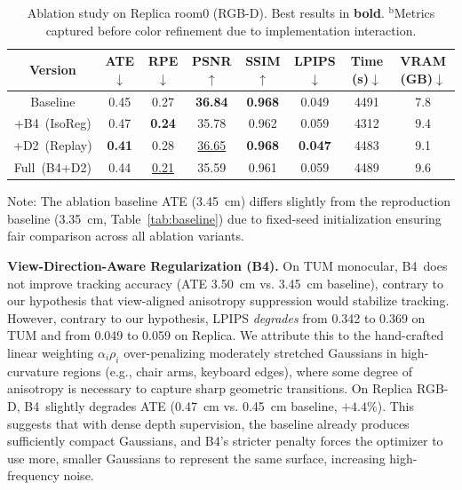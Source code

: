 \documentclass[conference]{IEEEtran}
\begin{document}
\begin{table}[htbp]
\caption{Ablation study on Replica room0 (RGB-D). Best results in \textbf{bold}. $^\mathrm{b}$Metrics captured before color refinement due to implementation interaction.}
\label{tab:ablation_rep}
\begin{center}
\small
\setlength{\tabcolsep}{4pt}
\begin{tabular}{|c|c|c|c|c|c|c|c|}
\hline
\textbf{Version} & \textbf{ATE$\downarrow$} & \textbf{RPE$\downarrow$} & \textbf{PSNR$\uparrow$} & \textbf{SSIM$\uparrow$} & \textbf{LPIPS$\downarrow$} & \textbf{Time (s)$\downarrow$} & \textbf{VRAM (GB)$\downarrow$} \\
\hline
Baseline & 0.45 & 0.27 & \textbf{36.84} & \textbf{0.968} & 0.049 & 4491 & 7.8 \\
\hline
+{B4}~(IsoReg) & 0.47 & \textbf{0.24} & 35.78 & 0.962 & 0.059 & 4312 & 9.4 \\
\hline
+{D2}~(Replay) & \textbf{0.41} & 0.28 & \underline{36.65} & \textbf{0.968} & \textbf{0.047} & 4483 & 9.1 \\
\hline
Full~({B4}+{D2}) & 0.44 & \underline{0.21} & 35.59 & 0.961 & 0.059 & 4489 & 9.6 \\
\hline
\end{tabular}
\end{center}
\vspace{1mm}
{\footnotesize Note: The ablation baseline ATE (3.45~cm) differs slightly from the reproduction baseline (3.35~cm, Table~\ref{tab:baseline}) due to fixed-seed initialization ensuring fair comparison across all ablation variants.}
\end{table}

\textbf{View-Direction-Aware Regularization ({B4}).}
On TUM monocular, {B4}~does not improve tracking accuracy (ATE 3.50~cm vs. 3.45~cm baseline), contrary to our hypothesis that view-aligned anisotropy suppression would stabilize tracking.
However, contrary to our hypothesis, LPIPS \textit{degrades} from 0.342 to 0.369 on TUM and from 0.049 to 0.059 on Replica.
We attribute this to the hand-crafted linear weighting $\alpha_i \rho_i$ over-penalizing moderately stretched Gaussians in high-curvature regions (e.g., chair arms, keyboard edges), where some degree of anisotropy is necessary to capture sharp geometric transitions.
On Replica RGB-D, {B4}~slightly degrades ATE (0.47~cm vs. 0.45~cm baseline, $+4.4\%$).
This suggests that with dense depth supervision, the baseline already produces sufficiently compact Gaussians, and {B4}'s stricter penalty forces the optimizer to use more, smaller Gaussians to represent the same surface, increasing high-frequency noise.
\end{document}

